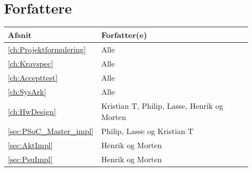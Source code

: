 \chapter*{Forfattere} %
\begin{table}[h]
\centering
\begin{tabularx}{/6}{|l|X|}
	\hline
	Afsnit & Forfatter(e) \\ \hline
	\ref{ch:Projektformulering} \nameref{ch:Projektformulering} & Alle \\ \hline
	\ref{ch:Kravspec} \nameref{ch:Kravspec} & Alle \\ \hline
	\ref{ch:Accepttest} \nameref{ch:Accepttest} & Alle \\ \hline
	\ref{ch:SysArk} \nameref{ch:SysArk} & Alle \\ \hline
	\ref{ch:HwDesign} \nameref{ch:HwDesign} & Kristian T, Philip, Lasse, Henrik og Morten \\ \hline
 		\ref{sec:PSoC_Master_impl} \nameref{sec:PSoC_Master_impl}  & Philip, Lasse og Kristian T \\ \hline
		\ref{sec:AktImpl} \nameref{sec:AktImpl} & Henrik og Morten \\ \hline
		\ref{sec:PsuImpl} \nameref{sec:PsuImpl} & Henrik og Morten \\ \hline
\end{tabularx}
\end{table}

\mainmatter








